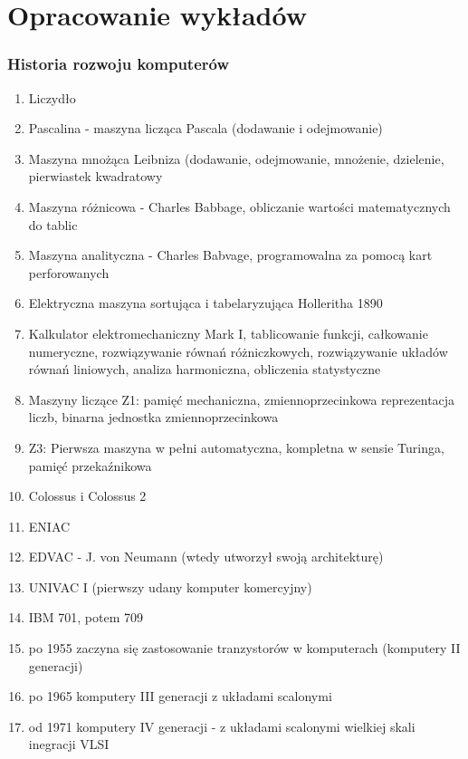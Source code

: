 \newpage
\part{Opracowanie wykładów}
\section*{Historia rozwoju komputerów}
	\begin{enumerate}
    \item Liczydło
    \item Pascalina - maszyna licząca Pascala (dodawanie i odejmowanie)
    \item Maszyna mnożąca Leibniza (dodawanie, odejmowanie, mnożenie, dzielenie, pierwiastek kwadratowy
    \item Maszyna różnicowa - Charles Babbage, obliczanie wartości matematycznych do tablic
    \item Maszyna analityczna - Charles Babvage, programowalna za pomocą kart perforowanych
  	\item Elektryczna maszyna sortująca i tabelaryzująca Holleritha 1890
    \item Kalkulator elektromechaniczny Mark I, tablicowanie funkcji, całkowanie numeryczne, rozwiązywanie równań różniczkowych, rozwiązywanie układów równań liniowych, analiza harmoniczna, obliczenia statystyczne
    \item Maszyny liczące Z1: pamięć mechaniczna, zmiennoprzecinkowa reprezentacja liczb, binarna jednostka zmiennoprzecinkowa
    \item Z3: Pierwsza maszyna w pełni automatyczna, kompletna w sensie Turinga, pamięć przekaźnikowa
    \item Colossus i Colossus 2
    \item ENIAC
    \item EDVAC - J. von Neumann (wtedy utworzył swoją architekturę) \\
    	\begin{figure}[h]
		\centering
		\end{figure}
    \item UNIVAC I (pierwszy udany komputer komercyjny)
    \item IBM 701, potem 709
    \item po 1955 zaczyna się zastosowanie tranzystorów w komputerach (komputery II generacji)
    \item po 1965 komputery III generacji z układami scalonymi
    \item od 1971 komputery IV generacji - z układami scalonymi wielkiej skali inegracji VLSI
    \end{enumerate}
    
